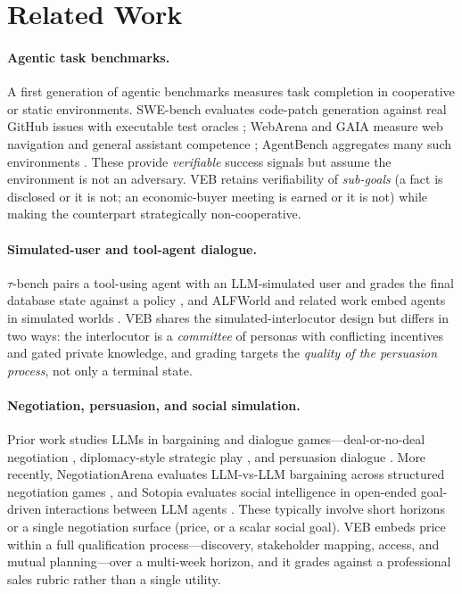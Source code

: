 \section{Related Work}
\label{sec:related}

\paragraph{Agentic task benchmarks.}
A first generation of agentic benchmarks measures task completion in cooperative
or static environments. SWE-bench evaluates code-patch generation against real
GitHub issues with executable test oracles \citep{jimenez2024swebench}; WebArena
and GAIA measure web navigation and general assistant competence
\citep{zhou2024webarena,mialon2023gaia}; AgentBench aggregates many such
environments \citep{liu2023agentbench}. These provide \emph{verifiable} success
signals but assume the environment is not an adversary. VEB retains verifiability
of \emph{sub-goals} (a fact is disclosed or it is not; an economic-buyer meeting
is earned or it is not) while making the counterpart strategically
non-cooperative.

\paragraph{Simulated-user and tool-agent dialogue.}
$\tau$-bench pairs a tool-using agent with an LLM-simulated user and grades the
final database state against a policy \citep{yao2024taubench}, and ALFWorld and
related work embed agents in simulated worlds \citep{shridhar2021alfworld}. VEB
shares the simulated-interlocutor design but differs in two ways: the interlocutor
is a \emph{committee} of personas with conflicting incentives and gated private
knowledge, and grading targets the \emph{quality of the persuasion process}, not
only a terminal state.

\paragraph{Negotiation, persuasion, and social simulation.}
Prior work studies LLMs in bargaining and dialogue games---deal-or-no-deal
negotiation \citep{lewis2017dealornodeal}, diplomacy-style strategic play
\citep{fair2022diplomacy}, and persuasion dialogue \citep{wang2019persuasion}.
More recently, NegotiationArena evaluates LLM-vs-LLM bargaining across structured
negotiation games \citep{bianchi2024negotiationarena}, and Sotopia evaluates
social intelligence in open-ended goal-driven interactions between LLM agents
\citep{zhou2024sotopia}. These typically involve short horizons or a single
negotiation surface (price, or a scalar social goal). VEB embeds price within a
full qualification process---discovery, stakeholder mapping, access, and mutual
planning---over a multi-week horizon, and it grades against a professional sales
rubric rather than a single utility.


